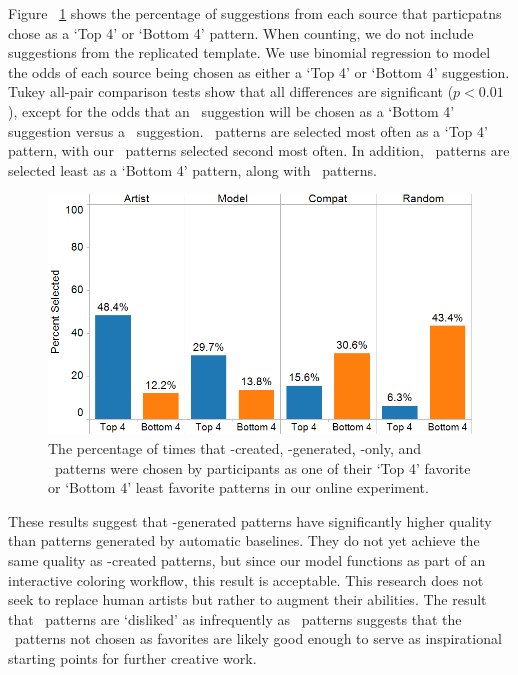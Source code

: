Figure ~\ref{fig:study} shows the percentage of suggestions from each source that particpatns chose as a `Top 4' or `Bottom 4' pattern. When counting, we do not include suggestions from the replicated template. We use binomial regression to model the odds of each source being chosen as either a `Top 4' or `Bottom 4' suggestion. Tukey all-pair comparison tests show that all differences are significant ($p < 0.01$), except for the odds that an \artistSource~suggestion will be chosen as a `Bottom 4' suggestion versus a \modelSource~suggestion. \artistSource~patterns are selected most often as a `Top 4' pattern, with our \modelSource~patterns selected second most often. In addition, \modelSource~patterns are selected least as a `Bottom 4' pattern, along with \artistSource~patterns.

\begin{figure}[h!]
  \begin{center}
  \includegraphics[width=\columnwidth]{figs/evaluation.png}
	\end{center}
\caption{The percentage of times that \artistSource-created, \modelSource-generated, \compatSource-only, and \randomSource~patterns were chosen by participants as one of their `Top 4' favorite or `Bottom 4' least favorite patterns in our online experiment.}

 \label{fig:study}
\end{figure}

These results suggest that \modelSource-generated patterns have significantly higher quality than patterns generated by automatic baselines. They do not yet achieve the same quality as \artistSource-created patterns, but since our model functions as part of an interactive coloring workflow, this result is acceptable. This research does not seek to replace human artists but rather to augment their abilities. The result that \modelSource~patterns are `disliked' as infrequently as \artistSource~patterns suggests that the \modelSource~patterns not chosen as favorites are likely good enough to serve as inspirational starting points for further creative work.